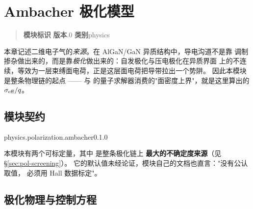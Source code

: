 
\chapter{Ambacher 极化模型}
\label{ch:polarization}

\begin{quote}
\small
\noindent\textbf{模块标识}\quad{}\qquad
\textbf{版本}.0\qquad
\textbf{类别}\quad physics
\end{quote}

\noindent
本章记述二维电子气的\emph{来源}。在 AlGaN/GaN 异质结构中，导电沟道不是靠
调制掺杂做出来的，而是靠\emph{极化}做出来的：自发极化与压电极化在异质界面
上的不连续，等效为一层束缚面电荷，正是这层面电荷把导带拉出一个势阱。
因此本模块是整条物理链的起点 ——  与
 的量子求解器消费的"面密度上界"，就是这里算出的
$\sigma_{\mathrm{eff}}/q$。

\section{模块契约}
\label{sec:pol-contract}

\begin{modulecard}{physics.polarization.ambacher}{0.1.0}
  \cardsep
\end{modulecard}

本模块有两个可标定量，其中  是整条极化链上
\textbf{最大的不确定度来源}（见 \S\ref{sec:pol-screening}）。
它的默认值未经论证，模块自己的文档也直言："没有公认取值，
必须用 Hall 数据标定"。

\section{极化物理与控制方程}
\label{sec:pol-physics}


